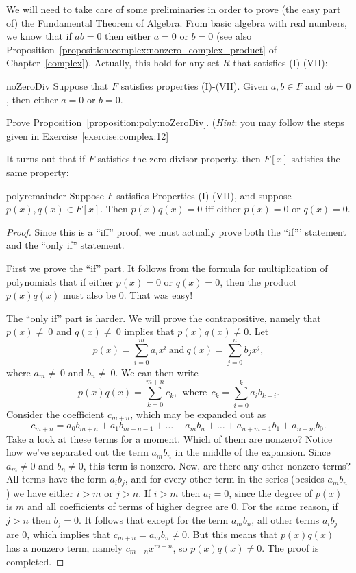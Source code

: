 We will need to take care of some preliminaries in order to prove (the easy part of) the Fundamental Theorem of Algebra. From basic algebra with real numbers, we know that if $ab=0$ then either $a=0$ or $b=0$ (see also 
Proposition~\ref{proposition:complex:nonzero_complex_product} of Chapter~\ref{complex}). Actually, this  hold for any set $R$ that satisfies (I)-(VII):

\begin{prop}{noZeroDiv} Suppose that $F$ satisfies properties (I)-(VII). Given $a,b \in F$ and $ab = 0$, then either $a=0$ or $b=0$. 
\end{prop}

\begin{exercise}{}
Prove Proposition~\ref{proposition:poly:noZeroDiv}.  (\emph{Hint}: you may follow the steps given in Exercise~\ref{exercise:complex:12} 
\end{exercise}

It turns out that if $F$ satisfies the zero-divisor property, then $F[x]$ satisfies the same property:

\begin{prop}{polyremainder}
Suppose $F$ satisfies Properties (I)-(VII), and suppose $p(x),  q(x) \in F[x]$. Then $p(x)  q(x)=0$ iff either $p(x)=0$ or $q(x)=0$.
\end {prop}
\begin{proof}
Since this is a ``iff'' proof, we must actually prove both the ``if''' statement and the ``only if'' statement.  

First we prove the ``if'' part.  It follows from  the formula for multiplication of polynomials that if either $p(x)=0$ or $q(x)=0$, then the product $p(x)q(x)$ must also be 0. That was easy!

The ``only if'' part is harder. We will prove the contrapositive, namely that  $p(x)\neq\ 0$ and  $ q(x)\neq\ 0$ implies that  $p(x)q(x) \neq 0$.
Let 
\[p(x) =  \sum_{i=0}^{m} a_i x^i \mathrm{~ and ~} q(x) =  \sum_{j=0}^{n} b_j x^j, \] 
where $a_m \neq\ 0$ and $b_n\neq\ 0$.
We can then write
 \[p(x) q(x) = \sum_{k=0}^{m+n} c_k, \mathrm{~~where~~} c_{k} =  \sum_{i=0}^{k}a_i b_{k-i}.\]
Consider the coefficient $c_{m+n}$, which may be expanded out as
\[
c_{m+n} =  a_0 b_{m+n} + a_1 b_{m+n-1} + \ldots  + a_{m}b_{n} + \dots +  a_{n+m-1}b_{1} + a_{n+m}b_{0}.
\]
Take a look at these terms for a moment. Which of them are nonzero?  Notice how we've separated out the term $a_{m}b_{n}$ in the middle of the expansion. Since $a_{m} \neq 0$ and $b_{n} \neq 0$, this term is nonzero. Now, are there
any other nonzero terms?  All terms have the  form $a_i b_j$, and for every other term in the series (besides $a_{m}b_{n}$) we have either $i>m$ or $j>n$.  If $i>m$ then $a_i=0$, since the degree of $p(x)$ is $m$ and all coefficients of terms of higher degree are 0.  For the same reason, if $j>n$ then $b_j=0$. It follows that except for the term $a_{m}b_{n}$, all other terms $a_ib_j$ are 0, which implies that $c_{m+n} = a_mb_n \neq 0$. But this means that $p(x)q(x)$ has a nonzero term, namely
$c_{m+n}x^{m+n}$, so $p(x)q(x) \neq 0$.    The proof is completed.
\end{proof}

